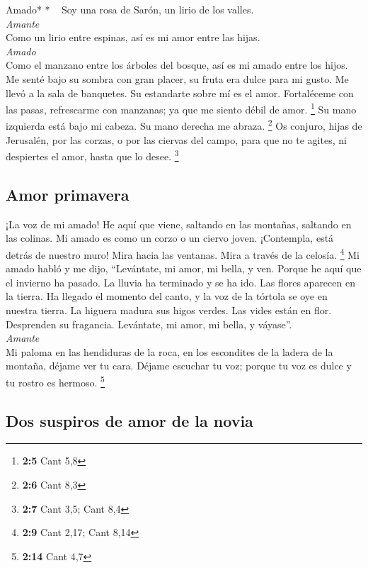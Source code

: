 \emph{\hfill\break
}Amado* * ~ Soy una rosa de Sarón, un lirio de los
valles.\\
\emph{Amante}\\
 Como un lirio entre espinas, así es mi amor entre las
hijas.\\
\emph{Amado}\\
 Como el manzano entre los árboles del bosque, así es mi
amado entre los hijos. Me senté bajo su sombra con gran placer, su fruta
era dulce para mi gusto.  Me llevó a la sala de banquetes.
Su estandarte sobre mí es el amor.  Fortaléceme con las
pasas, refrescarme con manzanas; ya que me siento débil de amor.
\footnote{\textbf{2:5} Cant 5,8}  Su mano izquierda está
bajo mi cabeza. Su mano derecha me abraza. \footnote{\textbf{2:6} Cant
  8,3}  Os conjuro, hijas de Jerusalén, por las corzas, o
por las ciervas del campo, para que no te agites, ni despiertes el amor,
hasta que lo desee. \footnote{\textbf{2:7} Cant 3,5; Cant 8,4}

\hypertarget{amor-primavera}{%
\subsection{Amor primavera}\label{amor-primavera}}

 ¡La voz de mi amado! He aquí que viene, saltando en las
montañas, saltando en las colinas.  Mi amado es como un
corzo o un ciervo joven. ¡Contempla, está detrás de nuestro muro! Mira
hacia las ventanas. Mira a través de la celosía. \footnote{\textbf{2:9}
  Cant 2,17; Cant 8,14}  Mi amado habló y me dijo,
``Levántate, mi amor, mi bella, y ven.  Porque he aquí
que el invierno ha pasado. La lluvia ha terminado y se ha ido.
 Las flores aparecen en la tierra. Ha llegado el momento
del canto, y la voz de la tórtola se oye en nuestra tierra.
 La higuera madura sus higos verdes. Las vides están en
flor. Desprenden su fragancia. Levántate, mi amor, mi bella, y
váyase''.\\
\emph{Amante}\\
 Mi paloma en las hendiduras de la roca, en los
escondites de la ladera de la montaña, déjame ver tu cara. Déjame
escuchar tu voz; porque tu voz es dulce y tu rostro es hermoso.
\footnote{\textbf{2:14} Cant 4,7}

\hypertarget{dos-suspiros-de-amor-de-la-novia}{%
\subsection{Dos suspiros de amor de la
novia}\label{dos-suspiros-de-amor-de-la-novia}}

